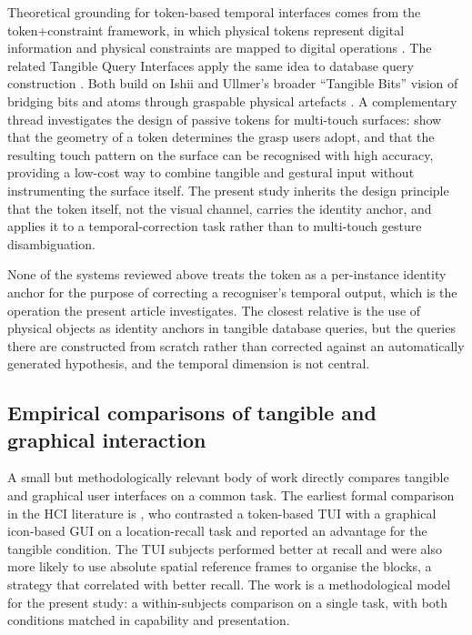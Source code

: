 \documentclass[10pt,a4paper,twocolumn]{article}
\begin{document}
Theoretical grounding for token-based temporal interfaces comes
from the token+constraint framework, in which physical tokens
represent digital information and physical constraints are mapped
to digital operations \citep{ullmer2005tokenconstraint}. The
related Tangible Query Interfaces apply the same idea to database
query construction \citep{ullmer2003tangiblequery}. Both build on
Ishii and Ullmer's broader ``Tangible Bits'' vision of bridging
bits and atoms through graspable physical artefacts
\citep{ishii1997tangiblebits}. A complementary thread
investigates the design of passive tokens for multi-touch
surfaces: \citet{morales2016touchtokens} show that the geometry
of a token determines the grasp users adopt, and that the
resulting touch pattern on the surface can be recognised with
high accuracy, providing a low-cost way to combine tangible and
gestural input without instrumenting the surface itself. The
present study inherits the design principle that the token
itself, not the visual channel, carries the identity anchor,
and applies it to a temporal-correction task rather than to
multi-touch gesture disambiguation.

None of the systems reviewed above treats the token as a
per-instance identity anchor for the purpose of correcting a
recogniser's temporal output, which is the operation the
present article investigates. The closest relative is the use
of physical objects as identity anchors in tangible database
queries, but the queries there are constructed from scratch
rather than corrected against an automatically generated
hypothesis, and the temporal dimension is not central.

\subsection{Empirical comparisons of tangible and graphical
  interaction}
\label{sec:lit-tui-vs-gui}

A small but methodologically relevant body of work directly
compares tangible and graphical user interfaces on a common
task. The earliest formal comparison in the HCI literature is
\citet{patten2000spatcmp}, who contrasted a token-based TUI
with a graphical icon-based GUI on a location-recall task and
reported an advantage for the tangible condition. The TUI
subjects performed better at recall and were also more likely
to use absolute spatial reference frames to organise the
blocks, a strategy that correlated with better recall. The
work is a methodological model for the present study: a
within-subjects comparison on a single task, with both
conditions matched in capability and presentation.
\end{document}
